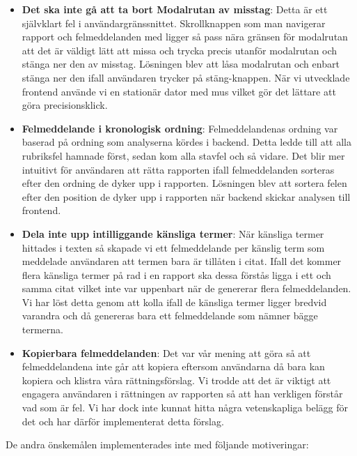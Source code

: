 \documentclass[swedish]{maucsthesis}
\begin{document}
\begin{itemize}
\item \textbf{Det ska inte gå att ta bort Modalrutan av misstag}: Detta är ett
  självklart fel i användargränssnittet. Skrollknappen som man navigerar rapport
  och felmeddelanden med ligger så pass nära gränsen för modalrutan att det är
  väldigt lätt att missa och trycka precis utanför modalrutan och stänga ner den
  av misstag. Lösningen blev att låsa modalrutan och enbart stänga ner den ifall
  användaren trycker på stäng-knappen. När vi utvecklade frontend använde vi en
  stationär dator med mus vilket gör det lättare att göra precisionsklick.
\item \textbf{Felmeddelande i kronologisk ordning}: Felmeddelandenas ordning var
  baserad på ordning som analyserna kördes i backend. Detta ledde till att alla
  rubriksfel hamnade först, sedan kom alla stavfel och så vidare. Det blir mer
  intuitivt för användaren att rätta rapporten ifall felmeddelanden sorteras
  efter den ordning de dyker upp i rapporten. Lösningen blev att sortera felen
  efter den position de dyker upp i rapporten när backend skickar analysen till
  frontend.
\item \textbf{Dela inte upp intilliggande känsliga termer}: När känsliga termer
  hittades i texten så skapade vi ett felmeddelande per känslig term som
  meddelade användaren att termen bara är tillåten i citat. Ifall det kommer
  flera känsliga termer på rad i en rapport ska dessa förstås ligga i ett och
  samma citat vilket inte var uppenbart när de genererar flera felmeddelanden.
  Vi har löst detta genom att kolla ifall de känsliga termer ligger bredvid
  varandra och då genereras bara ett felmeddelande som nämner bägge termerna.
  
\item \textbf{Kopierbara felmeddelanden}: Det var vår mening att göra så att
  felmeddelandena inte går att kopiera eftersom användarna då bara kan kopiera
  och klistra våra rättningsförslag. Vi trodde att det är viktigt att engagera användaren i
  rättningen av rapporten så att han verkligen förstår vad som är fel. Vi har dock inte kunnat hitta några vetenskapliga
  belägg för det och har därför implementerat detta förslag.
\end{itemize}

De andra önskemålen implementerades inte med följande motiveringar:
\end{document}
